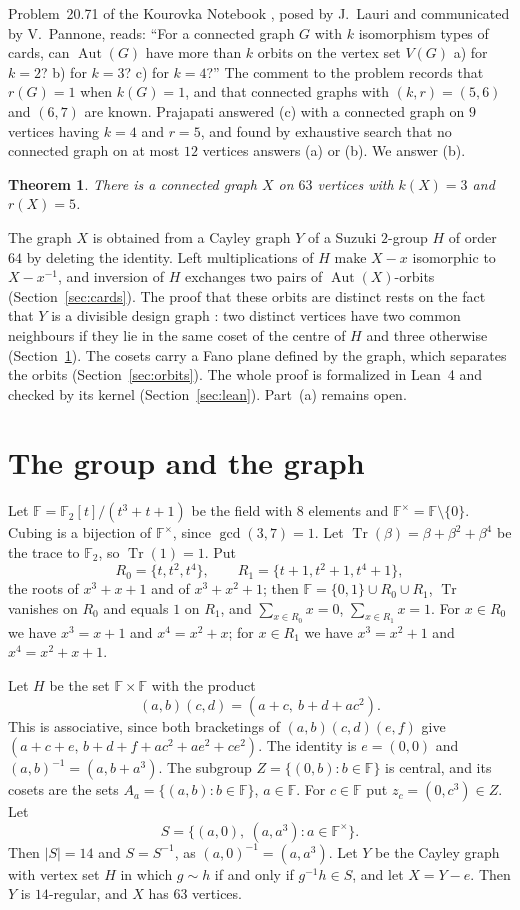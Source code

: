 \documentclass[preprint,12pt]{elsarticle}
\newtheorem{theorem}{Theorem}[section]
\theoremstyle{definition}
\newcommand{\F}{\mathbb{F}}
\newcommand{\Tr}{\operatorname{Tr}}
\newcommand{\Aut}{\operatorname{Aut}}
\begin{document}
Problem~20.71 of the Kourovka Notebook \cite{Kourovka}, posed by J.~Lauri and communicated by V.~Pannone, reads: ``For a connected graph $G$ with $k$ isomorphism types of cards, can $\Aut(G)$ have more than $k$ orbits on the vertex set $V(G)$ a) for $k=2$? b) for $k=3$? c) for $k=4$?'' The comment to the problem records that $r(G)=1$ when $k(G)=1$, and that connected graphs with $(k,r)=(5,6)$ and $(6,7)$ are known. Prajapati \cite{Prajapati} answered (c) with a connected graph on $9$ vertices having $k=4$ and $r=5$, and found by exhaustive search that no connected graph on at most $12$ vertices answers (a) or (b). We answer (b).

\begin{theorem}\label{thm:main}
There is a connected graph $X$ on $63$ vertices with $k(X)=3$ and $r(X)=5$.
\end{theorem}

The graph $X$ is obtained from a Cayley graph $Y$ of a Suzuki $2$-group $H$ of order $64$ \cite{Higman} by deleting the identity. Left multiplications of $H$ make $X-x$ isomorphic to $X-x^{-1}$, and inversion of $H$ exchanges two pairs of $\Aut(X)$-orbits (Section~\ref{sec:cards}). The proof that these orbits are distinct rests on the fact that $Y$ is a divisible design graph \cite{HKM}: two distinct vertices have two common neighbours if they lie in the same coset of the centre of $H$ and three otherwise (Section~\ref{sec:graph}). The cosets carry a Fano plane defined by the graph, which separates the orbits (Section~\ref{sec:orbits}). The whole proof is formalized in Lean~4 and checked by its kernel (Section~\ref{sec:lean}). Part~(a) remains open.

\section{The group and the graph}\label{sec:graph}

Let $\F=\F_2[t]/(t^3+t+1)$ be the field with $8$ elements and $\F^\times=\F\setminus\{0\}$. Cubing is a bijection of $\F^\times$, since $\gcd(3,7)=1$. Let $\Tr(\beta)=\beta+\beta^2+\beta^4$ be the trace to $\F_2$, so $\Tr(1)=1$. Put
\[
R_0=\{t,t^2,t^4\},\qquad R_1=\{t+1,t^2+1,t^4+1\},
\]
the roots of $x^3+x+1$ and of $x^3+x^2+1$; then $\F=\{0,1\}\cup R_0\cup R_1$, $\Tr$ vanishes on $R_0$ and equals $1$ on $R_1$, and $\sum_{x\in R_0}x=0$, $\sum_{x\in R_1}x=1$. For $x\in R_0$ we have $x^3=x+1$ and $x^4=x^2+x$; for $x\in R_1$ we have $x^3=x^2+1$ and $x^4=x^2+x+1$.

Let $H$ be the set $\F\times\F$ with the product
\[
(a,b)(c,d)=(a+c,\ b+d+ac^2).
\]
This is associative, since both bracketings of $(a,b)(c,d)(e,f)$ give $(a+c+e,\,b+d+f+ac^2+ae^2+ce^2)$. The identity is $e=(0,0)$ and $(a,b)^{-1}=(a,b+a^3)$. The subgroup $Z=\{(0,b):b\in\F\}$ is central, and its cosets are the sets $A_a=\{(a,b):b\in\F\}$, $a\in\F$. For $c\in\F$ put $z_c=(0,c^3)\in Z$. Let
\[
S=\{(a,0),\ (a,a^3) : a\in\F^\times\}.
\]
Then $|S|=14$ and $S=S^{-1}$, as $(a,0)^{-1}=(a,a^3)$. Let $Y$ be the Cayley graph with vertex set $H$ in which $g\sim h$ if and only if $g^{-1}h\in S$, and let $X=Y-e$. Then $Y$ is $14$-regular, and $X$ has $63$ vertices.
\end{document}
